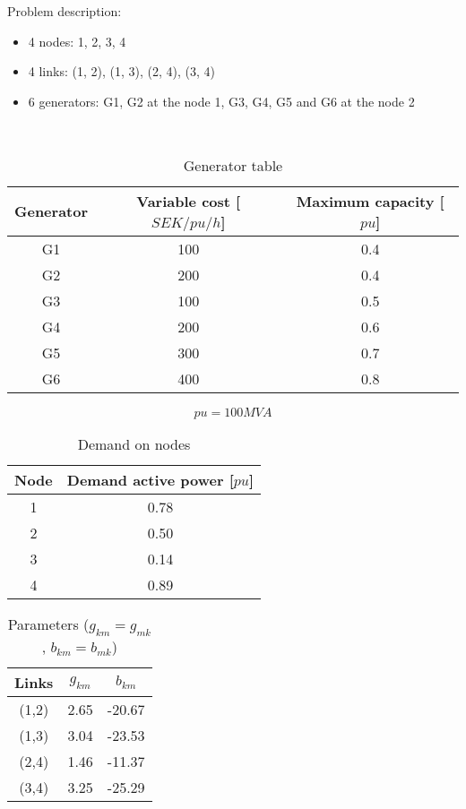 Problem description:
\begin{itemize}
    \item 4 nodes: 1, 2, 3, 4
    \item 4 links: (1, 2), (1, 3), (2, 4), (3, 4)
    \item 6 generators: G1, G2 at the node 1, G3, G4, G5 and G6 at the node 2
\end{itemize}
\\

\begin{table}[!h]
    \centering
    \begin{tabular}{|c |c| c|}
    \hline
    Generator & Variable cost [$SEK/pu/h$] & Maximum capacity [$pu$] \\
    \hline
    G1 & 100 & 0.4 \\
    G2 & 200 & 0.4 \\
    G3 & 100 & 0.5 \\
    G4 & 200 & 0.6 \\
    G5 & 300 & 0.7 \\
    G6 & 400 & 0.8 \\
    \hline
    \end{tabular}
    \caption{Generator table}
\end{table}

\[
pu = 100MVA
\]

\begin{table}[!h]
    \centering
    \begin{tabular}{|c |c|}
    \hline
    Node & Demand active power [$pu$] \\
    \hline
    1 & 0.78 \\
    2 & 0.50 \\
    3 & 0.14 \\
    4 & 0.89 \\
    \hline
    \end{tabular}
    \caption{Demand on nodes}
\end{table}




\begin{table}[!h]
    \centering
    \begin{tabular}{|c |c| c|}
    \hline
    Links & $g_{km}$ & $b_{km}$ \\
    \hline
    (1,2) & 2.65 & -20.67 \\
    (1,3) & 3.04 & -23.53 \\
    (2,4) & 1.46 & -11.37 \\
    (3,4) & 3.25 & -25.29 \\
    \hline
    \end{tabular}
    \caption{Parameters ($g_{km} = g_{mk}$, $b_{km} = b_{mk}$)}
\end{table}





